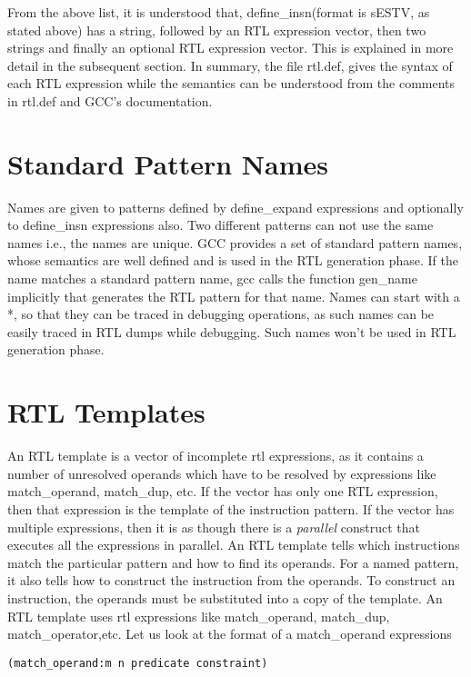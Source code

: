 From the above list, it is understood that, define\_insn(format is sESTV, as stated above) has a string, followed by an RTL expression 
vector, then
two strings and finally an optional RTL expression vector. This is explained in more detail in the subsequent section. In summary, the 
file rtl.def, gives the syntax of each RTL expression while the semantics can be understood from the comments in rtl.def and GCC's documentation\cite{gccint}.

\section{Standard Pattern Names}

Names are given to patterns defined by define\_expand expressions and optionally to define\_insn expressions also. Two different
patterns can not use the same names i.e., the names are unique. GCC provides a set of standard pattern names, whose semantics are well defined and is used
in the RTL generation phase. If the name matches a standard pattern name, gcc calls the function gen\_name implicitly that
generates the RTL pattern for that name. Names can start with a *, so that they can be traced in debugging operations, as such names can
be easily traced in RTL dumps while debugging. Such names
won't be used in RTL generation phase. 


\section{RTL Templates}


An RTL template is a vector of incomplete rtl expressions, as it contains a number of unresolved operands which have to be
resolved by expressions like match\_operand, match\_dup, etc. If the vector has only one RTL expression, then that expression is the 
template of the instruction pattern. 
If the vector has multiple expressions, then it is as though there is a \emph{parallel} construct that executes all the expressions in parallel.
An RTL template tells which instructions match the particular 
pattern and how to find its operands. For a named pattern, it also
tells how to construct the instruction from the operands. To construct an instruction, the operands must be substituted into a
copy of the template. An RTL template uses rtl expressions like match\_operand, match\_dup, match\_operator,etc. Let us look
at the format of a match\_operand expressions
\begin{verbatim}
(match_operand:m n predicate constraint) 
\end{verbatim}

